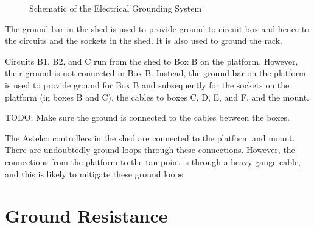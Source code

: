 \begin{figure*}
\begin{center}
{
}
\end{center}
\caption{Schematic of the Electrical Grounding System}
\label{figure:schematic-electrical-grounding-system}
\end{figure*}

The ground bar in the shed is used to provide ground to circuit box and hence to the circuits and the sockets in the shed. It is also used to ground the rack.

Circuits B1, B2, and C run from the shed to Box B on the platform. However, their ground is not connected in Box B. Instead, the ground bar on the platform is used to provide ground for Box B and subsequently for the sockets on the platform (in boxes B and C), the cables to boxes C, D, E, and F, and the mount.

TODO: Make sure the ground is connected to the cables between the boxes.

The Astelco controllers in the shed are connected to the platform and mount. There are undoubtedly ground loops through these connections. However, the connections from the platform to the tau-point is through a heavy-gauge cable, and this is likely to mitigate these ground loops.

\ifcoatli

\section{Ground Resistance}

